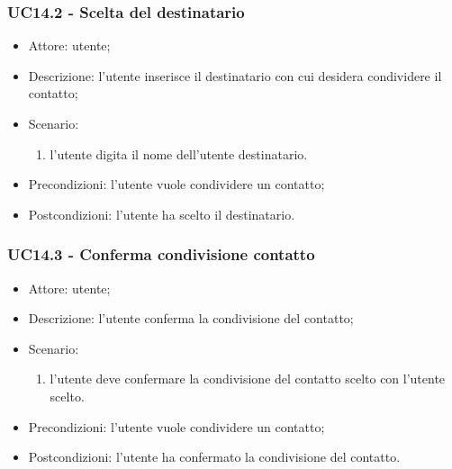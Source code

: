 \subsubsection{UC14.2 - Scelta del destinatario} \label{sec: UC14.2}
\begin{itemize}
    \item Attore: utente;
    \item Descrizione: l'utente inserisce il destinatario con cui desidera condividere il contatto;
    \item Scenario:
        \begin{enumerate}
        \item l'utente digita il nome dell'utente destinatario.
        \end{enumerate}
    
    \item Precondizioni: l'utente vuole condividere un contatto;
    \item Postcondizioni: l'utente ha scelto il destinatario.
\end{itemize}


\subsubsection{UC14.3 - Conferma condivisione contatto} \label{sec: UC14.3}
\begin{itemize}
    \item Attore: utente;
    \item Descrizione: l'utente conferma la condivisione del contatto;
    \item Scenario:
        \begin{enumerate}
        \item l'utente deve confermare la condivisione del contatto scelto con l'utente scelto.
        \end{enumerate}
    
    \item Precondizioni: l'utente vuole condividere un contatto;
    \item Postcondizioni: l'utente ha confermato la condivisione del contatto.
\end{itemize}

